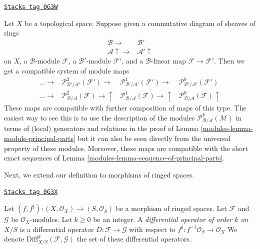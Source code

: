 \begin{remark}
\label{modules-remark-functoriality-principal-parts}
\href{https://stacks.math.columbia.edu/tag/0G3W}{\texttt{Stacks tag 0G3W}}

Let $X$ be a topological space. Suppose given a commutative diagram of
sheaves of rings
$$
\begin{array}{cc}\mathcal{B} \longrightarrow & \mathcal{B}' \\ \mathcal{A} \uparrow\longrightarrow & \mathcal{A}' \uparrow\end{array}
$$
on $X$, a $\mathcal{B}$-module $\mathcal{F}$,
a $\mathcal{B}'$-module $\mathcal{F}'$, and
a $\mathcal{B}$-linear map $\mathcal{F} \to \mathcal{F}'$.
Then we get a compatible system of module maps
$$
\begin{array}{cccc}\ldots \longrightarrow & \mathcal{P}^2_{\mathcal{B}'/\mathcal{A}'}(\mathcal{F}') \longrightarrow & \mathcal{P}^1_{\mathcal{B}'/\mathcal{A}'}(\mathcal{F}') \longrightarrow & \mathcal{P}^0_{\mathcal{B}'/\mathcal{A}'}(\mathcal{F}') \\ \ldots \longrightarrow & \mathcal{P}^2_{\mathcal{B}/\mathcal{A}}(\mathcal{F}) \longrightarrow\uparrow & \mathcal{P}^1_{\mathcal{B}/\mathcal{A}}(\mathcal{F}) \longrightarrow\uparrow & \mathcal{P}^0_{\mathcal{B}/\mathcal{A}}(\mathcal{F}) \uparrow\end{array}
$$
These maps are compatible with further composition of maps of this type.
The easiest way to see this is to use the description of the modules
$\mathcal{P}^k_{\mathcal{B}/\mathcal{A}}(\mathcal{M})$ in terms of
(local) generators and relations in the proof of
Lemma \ref{modules-lemma-module-principal-parts} but it can also be seen
directly from the universal
property of these modules. Moreover, these maps are compatible with
the short exact sequences of Lemma \ref{modules-lemma-sequence-of-principal-parts}.
\end{remark}

Next, we extend our definition to morphisms of ringed spaces.

\begin{definition}
\label{modules-definition-relative-differential-operators}
\href{https://stacks.math.columbia.edu/tag/0G3X}{\texttt{Stacks tag 0G3X}}

Let $(f, f^\sharp) : (X, \mathcal{O}_X) \to (S, \mathcal{O}_S)$
be a morphism of ringed spaces.
Let $\mathcal{F}$ and $\mathcal{G}$ be $\mathcal{O}_X$-modules.
Let $k \geq 0$ be an integer.
A {\it differential operator of order $k$ on $X/S$}
is a differential operator $D : \mathcal{F} \to \mathcal{G}$
with respect to $f^\sharp : f^{-1}\mathcal{O}_S \to \mathcal{O}_X$
We denote $\text{Diff}^k_{X/S}(\mathcal{F}, \mathcal{G})$
the set of these differential operators.
\end{definition}

